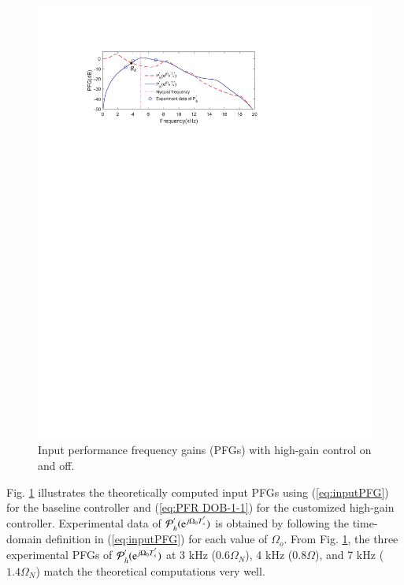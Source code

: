 \documentclass [11pt, proquest] {uwthesis}[2020/02/24]
\begin{document}
\begin{figure}[!ht]
\begin{centering}
\includegraphics[width=12cm]{Spectral-analysis/FIG16.pdf}
\par\end{centering}
\caption{\label{fig:Performace-frequency-gain-1}Input performance frequency
gains (PFGs) with high-gain control on and off.}
\end{figure}

Fig. \ref{fig:Performace-frequency-gain-1} illustrates the theoretically
computed input PFGs using (\ref{eq:inputPFG}) for the baseline controller
and (\ref{eq:PFR DOB-1-1}) for the customized high-gain controller.
Experimental data of $\mathcal{P}_{h}^{'}(\mathrm{e}^{j\Omega_{0}T_{s}^{'}})$
is obtained by following the time-domain definition in (\ref{eq:inputPFG})
for each value of $\Omega_{o}$. From Fig. \ref{fig:Performace-frequency-gain-1},
the three experimental PFGs of $\mathcal{P}_{h}^{'}(\mathrm{e}^{j\Omega_{0}T_{s}^{'}})$
at 3 kHz ($0.6\Omega_{N}$), 4 kHz ($0.8\Omega$), and 7 kHz ($1.4\Omega_{N}$)
match the theoretical computations very well.
\end{document}
